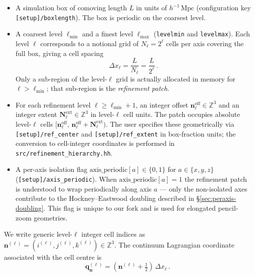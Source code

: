 \documentclass[12pt]{article}
\newcommand{\bq}{\mathbf{q}}
\newcommand{\bn}{\mathbf{n}}
\newcommand{\bN}{\mathbf{N}}
\newcommand{\code}[1]{\texttt{#1}}
\begin{document}
\begin{itemize}
  \item A simulation box of comoving length $L$ in units of
        $h^{-1}\,\mathrm{Mpc}$ (configuration key
        \code{[setup]/boxlength}).  The box is periodic on the coarsest
        level.
  \item A coarsest level $\ell_\mathrm{min}$ and a finest level
        $\ell_\mathrm{max}$ (\code{levelmin} and \code{levelmax}).
        Each level $\ell$ corresponds to a notional grid of
        $N_\ell = 2^\ell$ cells per axis covering the full box,
        giving a cell spacing
        \begin{equation}
          \Delta x_\ell = \frac{L}{N_\ell} = \frac{L}{2^\ell}\,.
          \label{eq:dxell}
        \end{equation}
        Only a sub-region of the level-$\ell$ grid is actually
        allocated in memory for $\ell > \ell_\mathrm{min}$; that
        sub-region is the \emph{refinement patch}.
  \item For each refinement level $\ell \ge \ell_\mathrm{min}+1$, an
        integer offset $\bn^\mathrm{off}_\ell \in \mathbb{Z}^3$ and
        an integer extent $\bN^\mathrm{ext}_\ell \in \mathbb{Z}^3$ in
        level-$\ell$ cell units.  The patch occupies absolute
        level-$\ell$ cells
        $[\bn^\mathrm{off}_\ell,\,\bn^\mathrm{off}_\ell + \bN^\mathrm{ext}_\ell)$.
        The user specifies these geometrically via
        \code{[setup]/ref\_center} and \code{[setup]/ref\_extent} in
        box-fraction units; the conversion to cell-integer
        coordinates is performed in
        \code{src/refinement\_hierarchy.hh}.
  \item A per-axis isolation flag
        $\mathrm{axis\_periodic}[a] \in \{0,1\}$ for
        $a \in \{x,y,z\}$ (\code{[setup]/axis\_periodic}).  When
        $\mathrm{axis\_periodic}[a] = 1$ the refinement patch is
        understood to wrap periodically along axis $a$ --- only the
        non-isolated axes contribute to the Hockney--Eastwood
        doubling described in \S\ref{sec:peraxis-doubling}.  This
        flag is unique to our fork and is used for elongated
        pencil-zoom geometries.
\end{itemize}

We write generic level-$\ell$ integer cell indices as
$\bn^{(\ell)} = (i^{(\ell)}, j^{(\ell)}, k^{(\ell)}) \in \mathbb{Z}^3$.
The continuum Lagrangian coordinate associated with the cell centre
is
\begin{equation}
  \bq^{(\ell)}_{\bn} = \left(\bn^{(\ell)} + \tfrac{1}{2}\right)\,\Delta x_\ell\,.
  \label{eq:qcoord}
\end{equation}
\end{document}
